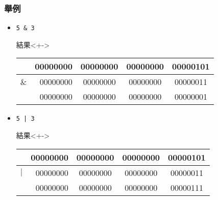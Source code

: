 \documentclass[utf8]{beamer}
\begin{document}
\begin{CJK}{UTF8}{bkai}
\begin{frame}[fragile]
  \frametitle{舉例}
  \begin{itemize}[<+->]
  \item \lstinline{5 & 3}{}
  \begin{block}{結果}<+->
    \begin{table}[h]
      \begin{tabular}{|c|r|c|c|c|}
      \hline
           & 00000000 & 00000000 & 00000000 & 00000\alert{101}\\
      \hline
      $\&$ & 00000000 & 00000000 & 00000000 & 00000\alert{011}\\
      \hline
      \hline
           & 00000000 & 00000000 & 00000000 & 00000\alert{001}\\
      \hline
      \end{tabular}
    \end{table}
  \end{block}
  \item \lstinline{5 | 3}{}
  \begin{block}{結果}<+->
    \begin{table}[h]
      \begin{tabular}{|c|r|c|c|c|}
      \hline
          & 00000000 & 00000000 & 00000000 & 00000\alert{101}\\
      \hline
      $|$ & 00000000 & 00000000 & 00000000 & 00000\alert{011}\\
      \hline
      \hline
          & 00000000 & 00000000 & 00000000 & 00000\alert{111}\\
      \hline
      \end{tabular}
    \end{table}
  \end{block}
  \end{itemize}
\end{frame}


\end{CJK}
\end{document}
